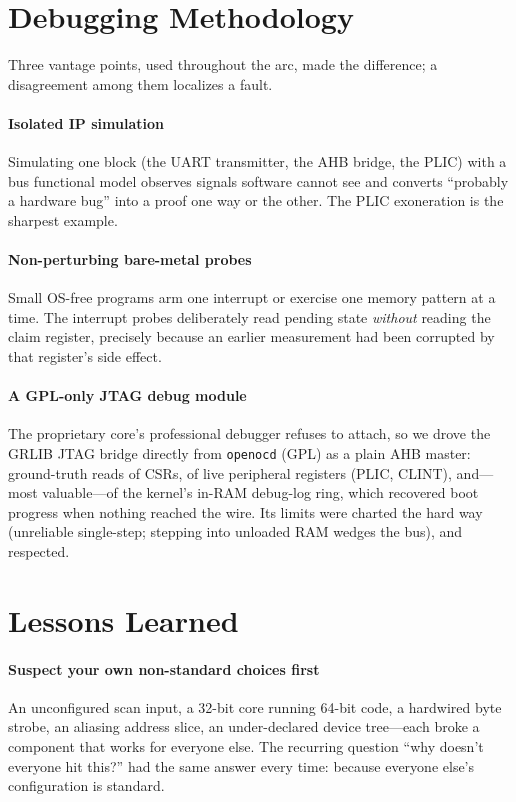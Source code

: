 \documentclass[conference,nofonttune]{IEEEtran}
\newcommand{\code}[1]{\texttt{#1}}
\begin{document}
\section{Debugging Methodology}
\label{sec:method}

Three vantage points, used throughout the arc, made the difference; a
disagreement among them localizes a fault.

\paragraph{Isolated IP simulation}
Simulating one block (the UART transmitter, the AHB bridge, the PLIC) with a bus
functional model observes signals software cannot see and converts ``probably a
hardware bug'' into a proof one way or the other. The PLIC exoneration is the
sharpest example.

\paragraph{Non-perturbing bare-metal probes}
Small OS-free programs arm one interrupt or exercise one memory pattern at a time.
The interrupt probes deliberately read pending state \emph{without} reading the
claim register, precisely because an earlier measurement had been corrupted by
that register's side effect.

\paragraph{A GPL-only JTAG debug module}
The proprietary core's professional debugger refuses to attach, so we drove the
GRLIB JTAG bridge directly from \code{openocd} (GPL) as a plain AHB master:
ground-truth reads of CSRs, of live peripheral registers (PLIC, CLINT), and---most
valuable---of the kernel's in-RAM debug-log ring, which recovered boot progress
when nothing reached the wire. Its limits were charted the hard way (unreliable
single-step; stepping into unloaded RAM wedges the bus), and respected.

\section{Lessons Learned}

\paragraph{Suspect your own non-standard choices first}
An unconfigured scan input, a 32-bit core running 64-bit code, a hardwired byte
strobe, an aliasing address slice, an under-declared device tree---each broke a
component that works for everyone else. The recurring question ``why doesn't
everyone hit this?'' had the same answer every time: because everyone else's
configuration is standard.
\end{document}
